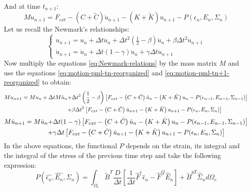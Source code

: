 And at time $t_{n+1}$:
\begin{equation}
M \ddot{u}_{n+1} = F_{ext} -\left(C+\tilde{C}\right)\dot{u}_{n+1} 
-\left(K+\tilde{K}\right)u_{n+1} - P(\epsilon_{n},E_{n},\Sigma_{n})
\label{eq:motion-pml-tn+1-reorganized}
\end{equation}
Let us recall the Newmark's relationships:
\begin{equation}
	\begin{cases}
		u_{n+1} = u_n + \Delta t \dot{u}_n + \Delta t^2 \left(\frac{1}{2}-\beta\right)\ddot{u}_n + \beta \Delta t^2 \ddot{u}_{n+1} \\
		\dot{u}_{n+1} = \dot{u}_n + \Delta t (1-\gamma) \ddot{u}_n + \gamma \Delta t \ddot{u}_{n+1}
	\end{cases}
	\label{eq:Newmark-relations}
\end{equation}
Now multiply the equations \ref{eq:Newmark-relations} by the mass matrix $M$ and use the equations \ref{eq:motion-pml-tn-reorganized} and \ref{eq:motion-pml-tn+1-reorganized} to obtain:
\begin{align}
		M u_{n+1} = M u_n + \Delta t M \dot{u}_n + &  \Delta t^2 \left(\frac{1}{2}-\beta\right)\left[ F_{ext} -\left(C+\tilde{C}\right)\dot{u}_n -\left(K+\tilde{K}\right)u_n - P(\epsilon_{n-1},E_{n-1},\Sigma_{n-1}) \right]  \notag\\ + &  \beta \Delta t^2 \left[ F_{ext} -\left(C+\tilde{C}\right)\dot{u}_{n+1} 
-\left(K+\tilde{K}\right)u_{n+1} - P(\epsilon_{n},E_{n},\Sigma_{n}) \right] 
	\label{eq:main-relations1}
\end{align}
\begin{align}
		M \dot{u}_{n+1} = M \dot{u}_n +  &\Delta t (1-\gamma) \left[ F_{ext} -\left(C+\tilde{C}\right)\dot{u}_n 
-\left(K+\tilde{K}\right)u_n - P(\epsilon_{n-1},E_{n-1},\Sigma_{n-1}) \right] \notag\\ + & \gamma \Delta t \left[ F_{ext} -\left(C+\tilde{C}\right)\dot{u}_{n+1} 
-\left(K+\tilde{K}\right)u_{n+1} - P(\epsilon_{n},E_{n},\Sigma_{n}) \right] 
	\label{eq:main-relations2}
\end{align}
In the above equations, the functional $P$ depends on the strain, its integral and the integral of the stress of the previous time step and take the following expression:
\begin{equation}
P(\hat{\epsilon_n},\hat{E_n},\hat{\Sigma_n}) = \int_{\Omega_e} \tilde{B}^T \frac{D}{\Delta t}\left[\frac{1}{\Delta t} \hat{F}^\epsilon \hat{\epsilon}_n - \hat{F}^Q \hat{E}_n  \right] + \tilde{B}^{p T} \hat{\Sigma}_n d\Omega_e
\label{eq:P-exp}
\end{equation}
